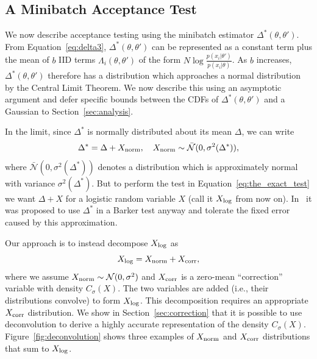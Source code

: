 \documentclass{article}
\begin{document}
\subsection{A Minibatch Acceptance Test}\label{ssec:deltas_minibatch}

We now describe acceptance testing using the minibatch estimator
$\Delta^*(\theta,\theta')$. From Equation~\ref{eq:delta3},
$\Delta^*(\theta,\theta')$ can be represented as a constant term plus the mean
of $b$ IID terms $\Lambda_i(\theta,\theta')$ of the form
$N\log\frac{p(x_i|\theta')}{p(x_i|\theta)}$. As $b$ increases,
$\Delta^*(\theta,\theta')$ therefore has a distribution which approaches a
normal distribution by the Central Limit Theorem. We now describe this using an
asymptotic argument and defer specific bounds between the CDFs of
$\Delta^*(\theta,\theta')$ and a Gaussian to Section~\ref{sec:analysis}.

In the limit, since $\Delta^*$ is normally distributed about its mean $\Delta$,
we can write
\begin{equation}\label{eq:relationship}
    \Delta^* = \Delta + X_{\rm norm}, \quad X_{\rm norm} \sim \mathcal{\bar{N}}(0, \sigma^2(\Delta^*)),
\end{equation}
where $\mathcal{\bar{N}}(0, \sigma^2(\Delta^*))$ denotes a distribution which is
approximately normal with variance $\sigma^2(\Delta^*)$.  But to perform the
test in Equation~\ref{eq:the_exact_test} we want $\Delta + X$ for a logistic
random variable $X$ (call it $X_{\rm log}$ from now on). In~\cite{Bardenet15} it
was proposed to use $\Delta^*$ in a Barker test anyway and tolerate the fixed
error caused by this approximation. 

Our approach is to instead decompose $X_{\rm log}$ as
\begin{equation}\label{eq:deconvolution}
    X_{\rm log} = X_{\rm norm}+X_{\rm corr},
\end{equation}
where we assume $X_{\rm norm} \sim \mathcal{N}(0, \sigma^2)$ and $X_{\rm corr}$
is a zero-mean ``correction'' variable with density $C_{\sigma}(X)$.  The two
variables are added (i.e., their distributions convolve) to form $X_{\rm log}$.
This decomposition requires an appropriate $X_{\rm corr}$ distribution. We show
in Section~\ref{sec:correction} that it is possible to use deconvolution to
derive a highly accurate representation of the density $C_\sigma(X)$.
Figure~\ref{fig:deconvolution} shows three examples of $X_{\rm norm}$ and
$X_{\rm corr}$ distributions that sum to $X_{\rm log}$.
\end{document}

